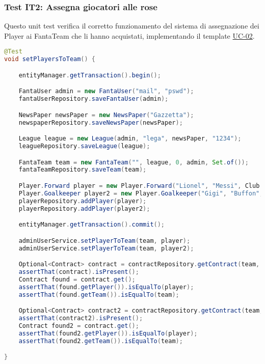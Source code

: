 \subsubsection{Test IT2: Assegna giocatori alle rose} \label{IT2}

Questo unit test verifica il corretto funzionamento del sistema di assegnazione dei Player ai FantaTeam che li hanno acquistati,
implementando il template \hyperref[UC-02]{UC-02}.

\begin{lstlisting}[language=Java]
@Test
void setPlayersToTeam() {

	entityManager.getTransaction().begin();

    FantaUser admin = new FantaUser("mail", "pswd");
	fantaUserRepository.saveFantaUser(admin);

    NewsPaper newsPaper = new NewsPaper("Gazzetta");
	newspaperRepository.saveNewsPaper(newsPaper);

    League league = new League(admin, "lega", newsPaper, "1234");
	leagueRepository.saveLeague(league);

	FantaTeam team = new FantaTeam("", league, 0, admin, Set.of());
	fantaTeamRepository.saveTeam(team);

	Player.Forward player = new Player.Forward("Lionel", "Messi", Club.CREMONESE);
	Player.Goalkeeper player2 = new Player.Goalkeeper("Gigi", "Buffon", Club.JUVENTUS);
	playerRepository.addPlayer(player);
	playerRepository.addPlayer(player2);

	entityManager.getTransaction().commit();

	adminUserService.setPlayerToTeam(team, player);
	adminUserService.setPlayerToTeam(team, player2);

	Optional<Contract> contract = contractRepository.getContract(team, player);
	assertThat(contract).isPresent();
	Contract found = contract.get();
	assertThat(found.getPlayer()).isEqualTo(player);
	assertThat(found.getTeam()).isEqualTo(team);

    Optional<Contract> contract2 = contractRepository.getContract(team, player);
	assertThat(contract2).isPresent();
	Contract found2 = contract.get();
	assertThat(found2.getPlayer()).isEqualTo(player);
	assertThat(found2.getTeam()).isEqualTo(team);

}
\end{lstlisting}


